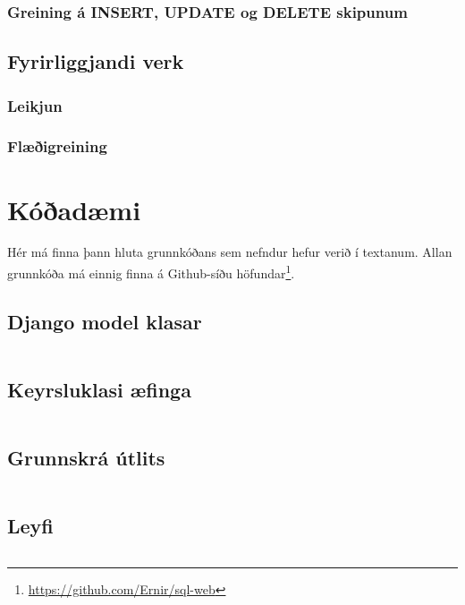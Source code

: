 \documentclass[a4paper,12pt,twoside,BCOR=10mm]{scrbook}
\begin{document}
\subsection{Greining á INSERT, UPDATE og DELETE skipunum}
\section{Fyrirliggjandi verk}
\subsection{Leikjun}
\subsection{Flæðigreining}




\appendix
\renewcommand{\chaptername}{Appendix}
\chapter{Kóðadæmi}
Hér má finna þann hluta grunnkóðans sem nefndur hefur verið í textanum. Allan grunnkóða má einnig finna á Github-síðu höfundar\footnote{\url{https://github.com/Ernir/sql-web}}.
\section{Django model klasar}
\label{code:django-model-objects}
\inputminted[fontsize=\scriptsize, frame=lines, linenos=true, python3=true, label=models.py]{python}{../sql\string_web/models.py}
\section{Keyrsluklasi æfinga}
\label{code:example-runner}
\inputminted[fontsize=\scriptsize, frame=lines, linenos=true, python3=true, label=sql_runner.py]{python}{../sql\string_web/sql\string_runner.py}
\section{Grunnskrá útlits}
\label{code:base-template}
\inputminted[fontsize=\scriptsize, frame=lines, linenos=true, label=base.html]{html}{../templates/base.html}
\section{Leyfi}
\label{code:license}
\inputminted[fontsize=\scriptsize, frame=lines, linenos=true, label=LICENSE.md]{markdown}{../LICENSE.md}
\end{document}
